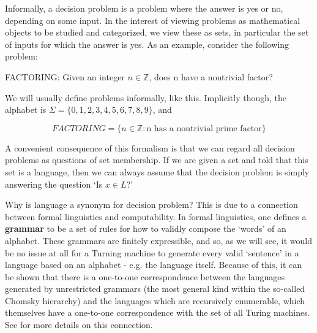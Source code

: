 Informally, a decision problem is a problem where the answer is yes or no, depending on some input. In the interest of viewing problems as mathematical objects to be studied and categorized, we view these as sets, in particular the set of inputs for which the answer is yes. As an example, consider the following problem:

\begin{problem}
FACTORING: Given an integer $n \in \mathbb{Z}$, does n have a nontrivial factor?
\end{problem}

We will usually define problems informally, like this. Implicitly though, the alphabet is $\Sigma = \{0,1,2,3,4,5,6,7,8,9\}$, and

\[FACTORING = \{n\in\mathbb{Z}: \textrm{n has a nontrivial prime factor}\} \]

A convenient consequence of this formalism is that we can regard all decision problems as questions of set membership. If we are given a set and told that this set is a language, then we can always assume that the decision problem is simply answering the question `Is $x\in L$?'

Why is language a synonym for decision problem? This is due to a connection between formal linguistics and computability. In formal linguistics, one defines a \textbf{grammar} to be a set of rules for how to validly compose the `words' of an alphabet. These grammars are finitely expressible, and so, as we will see, it would be no issue at all for a Turning machine to generate every valid `sentence' in a language based on an alphabet - e.g. the language itself. Because of this, it can be shown that there is a one-to-one correspondence between the languages generated by unrestricted grammars (the most general kind within the so-called Chomsky hierarchy) and the languages which are recursively enumerable, which themselves have a one-to-one correspondence with the set of all Turing machines. See 
\cite{lewisElementsTheoryComputation1998} for more details on this connection.

